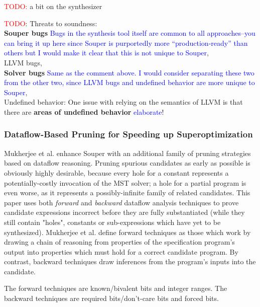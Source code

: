 \documentclass[12pt,twoside]{reedthesis}
\newcommand{\red}[1]{\textcolor{red}{#1}}
\newcommand{\comment}[2]{\textbf{#1} \textcolor{blue}{#2}}
\begin{document}
            
            \red{TODO:} a bit on the synthesizer
            
            \red{TODO}: Threats to soundness:
            \\ \comment{Souper bugs}{Bugs in the synthesis tool itself are common to all approaches--you can bring it up here since Souper is purportedly more ``production-ready'' than others but I would make it clear that this is not unique to Souper},
            \\ LLVM bugs,
            \\ \comment{Solver bugs}{Same as the comment above. I would consider separating these two from the other two, since LLVM bugs and undefined behavior are more unique to Souper},
            \\ Undefined behavior: One issue with relying on the semantics of LLVM is that there are \comment{areas of undefined behavior}{elaborate}!

        \subsubsection{Dataflow-Based Pruning for Speeding up Superoptimization}
            Mukherjee et al. \cite{mukherjee2020dataflow} enhance Souper with an additional family of pruning strategies based on dataflow reasoning. 
            Pruning spurious candidates as early as possible is obviously highly desirable, because every hole for a constant represents a potentially-costly invocation of the MST solver; a hole for a partial program is even worse, as it represents a possibly-infinite family of related candidates.
            This paper uses both \textit{forward} and \textit{backward} dataflow analysis techniques to prove candidate expressions incorrect before they are fully substantiated (while they still contain "holes", constants or sub-expressions which have yet to be synthesized).
            Mukherjee et al. define forward techniques as those which work by drawing a chain of reasoning from properties of the specification program's output into properties which must hold for a correct candidate program.
            By contrast, backward techniques draw inferences from the program's inputs into the candidate.
            
            The forward techniques are known/bivalent bits and integer ranges.
            The backward techniques are required bits/don't-care bits and forced bits.
            
\end{document}
